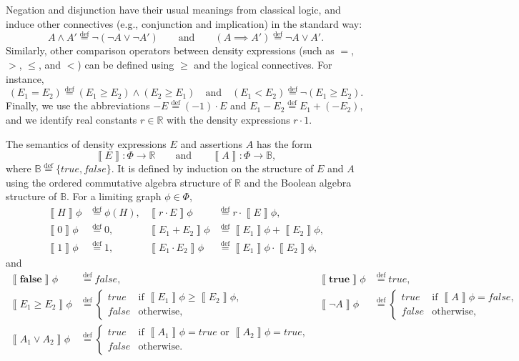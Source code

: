 \documentclass{article}
\newcommand*{\defeq}{\stackrel{\mathrm{def}}{=}}
\newcommand*{\lfalse}{\mathbf{false}}
\newcommand*{\ltrue}{\mathbf{true}}
\newcommand*{\sfalse}{\textit{false}}
\newcommand*{\strue}{\textit{true}}
\newcommand*{\db}[1]{\left\llbracket #1 \right\rrbracket}
\begin{document}
Negation and disjunction have their usual meanings from classical logic, and induce other connectives (e.g., conjunction and implication) in the standard way:
\[
A \land A' \defeq \neg(\neg A \lor \neg A')
\qquad\text{and}\qquad
(A \implies A') \defeq \neg A \lor A'.
\]
Similarly, other comparison operators between density expressions (such as $=$, $>$, $\leq$, and $<$) can be defined using $\geq$ and the logical connectives.
For instance,
\[
(E_1 = E_2) \defeq (E_1 \geq E_2) \land (E_2 \geq E_1)
\quad\text{and}\quad
(E_1 < E_2) \defeq \neg (E_1 \geq E_2).
\]
Finally, we use the abbreviations $-E \defeq (-1)\cdot E$ and $E_1 - E_2 \defeq E_1 + (-E_2)$, and we identify real constants $r \in \mathbb{R}$ with the density expressions $r \cdot 1$.

The semantics of density expressions $E$ and assertions $A$ has the form
\[
\db{E} : \Phi \to \mathbb{R}
\qquad\text{and}\qquad
\db{A} : \Phi \to \mathbb{B},
\]
where $\mathbb{B} \defeq \{\strue,\sfalse\}$.
It is defined by induction on the structure of $E$ and $A$ using the ordered commutative algebra structure of $\mathbb{R}$ and the Boolean algebra structure of $\mathbb{B}$.
For a limiting graph $\phi \in \Phi$,
\begin{align*}
\db{H}\phi & \defeq \phi(H),
&
\db{r \cdot E}\phi & \defeq r \cdot \db{E}\phi,
\\
\db{0}\phi & \defeq 0,
&
\db{E_1 + E_2}\phi & \defeq \db{E_1}\phi + \db{E_2}\phi,
\\
\db{1}\phi & \defeq 1,
&
\db{E_1 \cdot E_2}\phi & \defeq \db{E_1}\phi \cdot \db{E_2}\phi,
\end{align*}
and
\begin{align*}
\db{\lfalse}\phi & \defeq \sfalse,
&
\db{\ltrue}\phi & \defeq \strue,
\\
\db{E_1 \geq E_2}\phi & \defeq
\begin{cases}
  \strue & \text{if } \db{E_1}\phi \geq \db{E_2}\phi,
  \\
  \sfalse & \text{otherwise},
\end{cases}
&
\db{\neg A}\phi & \defeq
\begin{cases}
  \strue & \text{if } \db{A}\phi = \sfalse,
  \\
  \sfalse & \text{otherwise},
\end{cases}
\\
\db{A_1 \lor A_2}\phi & \defeq
\begin{cases}
  \strue & \text{if } \db{A_1}\phi = \strue \text{ or } \db{A_2}\phi = \strue,
  \\
  \sfalse & \text{otherwise}.
\end{cases}
\end{align*}
\end{document}
